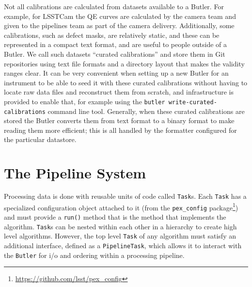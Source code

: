 \documentclass[]{spie}
\begin{document}
Not all calibrations are calculated from datasets available to a Butler.
For example, for LSSTCam the QE curves are calculated by the camera team and given to the pipelines team as part of the camera delivery.
Additionally, some calibrations, such as defect masks, are relatively static, and these can be represented in a compact text format, and are useful to people outside of a Butler.
We call such datasets ``curated calibrations'' and store them in Git repositories using text file formats and a directory layout that makes the validity ranges clear.
It can be very convenient when setting up a new Butler for an instrument to be able to seed it with these curated calibrations without having to locate raw data files and reconstruct them from scratch, and infrastructure is provided to enable that, for example using the \texttt{butler write-curated-calibrations} command line tool.
Generally, when these curated calibrations are stored the Butler converts them from text format to a binary format to make reading them more efficient; this is all handled by the formatter configured for the particular datastore.

\section{The Pipeline System}

\setcounter{footnote}{0}  %

Processing data is done with reusable units of code called \texttt{Task}s.
Each \texttt{Task} has a specialized configuration object attached to it (from the \texttt{pex\_config} package\footnote{\url{https://github.com/lsst/pex_config}}) and must provide a \texttt{run()} method that is the method that implements the algorithm.
\texttt{Task}s can be nested within each other in a hierarchy to create high level algorithms.
However, the top level \texttt{Task} of any algorithm must satisfy an additional interface, defined as a \texttt{PipelineTask}, which allows it to interact with the \texttt{Butler} for i/o and ordering within a processing pipeline.
\end{document}
